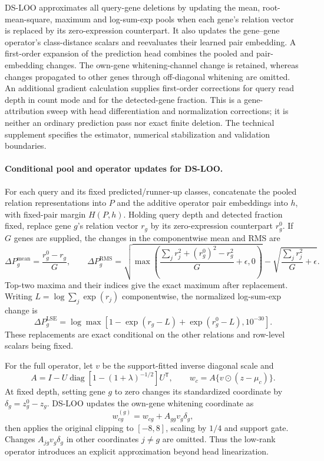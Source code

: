 DS-LOO approximates all query-gene deletions by updating the mean, root-mean-square, maximum and log-sum-exp pools when each gene's relation vector is replaced by its zero-expression counterpart. It also updates the gene--gene operator's class-distance scalars and reevaluates their learned pair embedding. A first-order expansion of the prediction head combines the pooled and pair-embedding changes. The own-gene whitening-channel change is retained, whereas changes propagated to other genes through off-diagonal whitening are omitted. An additional gradient calculation supplies first-order corrections for query read depth in count mode and for the detected-gene fraction. This is a gene-attribution sweep with head differentiation and normalization corrections; it is neither an ordinary prediction pass nor exact finite deletion. The technical supplement specifies the estimator, numerical stabilization and validation boundaries.

\paragraph{Conditional pool and operator updates for DS-LOO.}
For each query and its fixed predicted/runner-up classes, concatenate the pooled relation representations into $P$ and the additive operator pair embeddings into $h$, with fixed-pair margin $H(P,h)$. Holding query depth and detected fraction fixed, replace gene $g$'s relation vector $r_g$ by its zero-expression counterpart $r_g^0$. If $G$ genes are supplied, the changes in the componentwise mean and RMS are
\[
 \Delta P_g^{\mathrm{mean}}=\frac{r_g^0-r_g}{G},\qquad
 \Delta P_g^{\mathrm{RMS}}=
 \sqrt{\max\!\left(\frac{\sum_j r_j^2+(r_g^0)^2-r_g^2}{G}+\epsilon,0\right)}
 -\sqrt{\frac{\sum_j r_j^2}{G}+\epsilon}.
\]
Top-two maxima and their indices give the exact maximum after replacement. Writing $L=\log\sum_j\exp(r_j)$ componentwise, the normalized log-sum-exp change is
\[
 \Delta P_g^{\mathrm{LSE}}=
 \log\max\!\left[1-\exp(r_g-L)+\exp(r_g^0-L),10^{-30}\right].
\]
These replacements are exact conditional on the other relations and row-level scalars being fixed.

For the full operator, let $v$ be the support-fitted inverse diagonal scale and
\[
 A=I-U\operatorname{diag}\!\left[1-(1+\lambda)^{-1/2}\right]U^{\mathsf T},
 \qquad w_c=A\{v\odot(z-\mu_c)\}.
\]
At fixed depth, setting gene $g$ to zero changes its standardized coordinate by $\delta_g=z_g^0-z_g$. DS-LOO updates the own-gene whitening coordinate as
\[
 w_{cg}^{(g)}=w_{cg}+A_{gg}v_g\delta_g,
\]
then applies the original clipping to $[-8,8]$, scaling by $1/4$ and support gate. Changes $A_{jg}v_g\delta_g$ in other coordinates $j\ne g$ are omitted. Thus the low-rank operator introduces an explicit approximation beyond head linearization.

